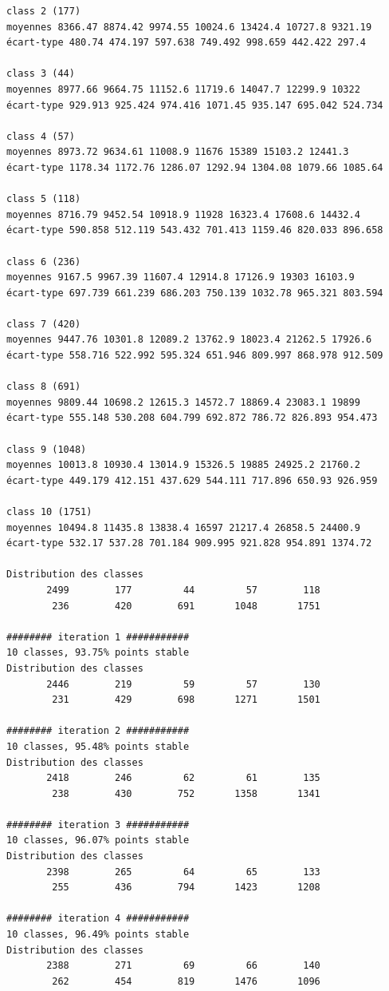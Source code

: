\documentclass[land,article,submit,pdftex,moreauthors]{Definitions/mdpi}
\begin{document}
\begin{scriptsize}
\begin{verbatim}
class 2 (177)
moyennes 8366.47 8874.42 9974.55 10024.6 13424.4 10727.8 9321.19
écart-type 480.74 474.197 597.638 749.492 998.659 442.422 297.4

class 3 (44)
moyennes 8977.66 9664.75 11152.6 11719.6 14047.7 12299.9 10322
écart-type 929.913 925.424 974.416 1071.45 935.147 695.042 524.734

class 4 (57)
moyennes 8973.72 9634.61 11008.9 11676 15389 15103.2 12441.3
écart-type 1178.34 1172.76 1286.07 1292.94 1304.08 1079.66 1085.64

class 5 (118)
moyennes 8716.79 9452.54 10918.9 11928 16323.4 17608.6 14432.4
écart-type 590.858 512.119 543.432 701.413 1159.46 820.033 896.658

class 6 (236)
moyennes 9167.5 9967.39 11607.4 12914.8 17126.9 19303 16103.9
écart-type 697.739 661.239 686.203 750.139 1032.78 965.321 803.594

class 7 (420)
moyennes 9447.76 10301.8 12089.2 13762.9 18023.4 21262.5 17926.6
écart-type 558.716 522.992 595.324 651.946 809.997 868.978 912.509

class 8 (691)
moyennes 9809.44 10698.2 12615.3 14572.7 18869.4 23083.1 19899
écart-type 555.148 530.208 604.799 692.872 786.72 826.893 954.473

class 9 (1048)
moyennes 10013.8 10930.4 13014.9 15326.5 19885 24925.2 21760.2
écart-type 449.179 412.151 437.629 544.111 717.896 650.93 926.959

class 10 (1751)
moyennes 10494.8 11435.8 13838.4 16597 21217.4 26858.5 24400.9
écart-type 532.17 537.28 701.184 909.995 921.828 954.891 1374.72

Distribution des classes
       2499        177         44         57        118
        236        420        691       1048       1751

######## iteration 1 ###########
10 classes, 93.75% points stable
Distribution des classes
       2446        219         59         57        130
        231        429        698       1271       1501

######## iteration 2 ###########
10 classes, 95.48% points stable
Distribution des classes
       2418        246         62         61        135
        238        430        752       1358       1341

######## iteration 3 ###########
10 classes, 96.07% points stable
Distribution des classes
       2398        265         64         65        133
        255        436        794       1423       1208

######## iteration 4 ###########
10 classes, 96.49% points stable
Distribution des classes
       2388        271         69         66        140
        262        454        819       1476       1096


\end{verbatim}
\end{scriptsize}
\end{document}

